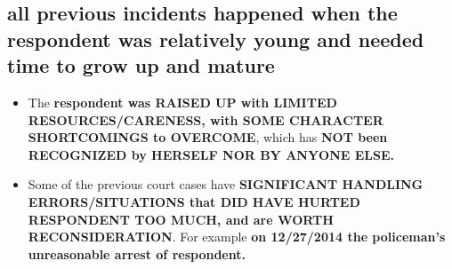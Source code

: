 \documentclass[9pt, b5paper]{article}
\begin{document}
\subsection{all previous incidents happened when the respondent was relatively young and needed time to grow up and mature}
\label{sec-1-3}
\begin{itemize}
\item The \textbf{respondent was RAISED UP with LIMITED RESOURCES/CARENESS, with SOME CHARACTER SHORTCOMINGS to OVERCOME}, which has \textbf{NOT been RECOGNIZED by HERSELF NOR BY ANYONE ELSE.}
\item Some of the previous court cases have \textbf{SIGNIFICANT HANDLING ERRORS/SITUATIONS that DID HAVE HURTED RESPONDENT TOO MUCH, and are WORTH RECONSIDERATION}. For example \textbf{on 12/27/2014 the policeman's unreasonable arrest of respondent.}
\end{itemize}
\end{document}
